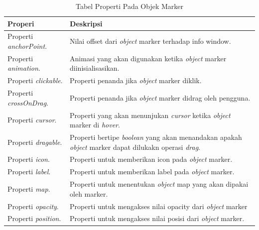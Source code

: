 \begin{table}[H] 
	\centering 
	\caption{Tabel Properti Pada Objek Marker}
	\label{tab:radioPackages}
	\begin{tabular}{|p{8cm}|p{8cm}|}
	\hline
		Properi & Deskripsi \\
    \hline
    	Properti \textit{anchorPoint}.& Nilai offset dari \textit{object} marker terhadap info window. \\
    	Properti \textit{animation}.  & Animasi yang akan digunakan ketika \textit{object} marker diinisialisasikan.  \\
    	Properti \textit{clickable}.  & Properti penanda jika \textit{object} marker diklik.  \\
    	Properti \textit{crossOnDrag}.  & Properti penanda jika \textit{object} marker didrag oleh pengguna. \\
    	Properti \textit{cursor}.  & Properti yang akan menunjukan \textit{cursor}  ketika \textit{object} marker di \textit{hover}. \\
    	Properti \textit{dragable}.  & Properti bertipe \textit{boolean} yang akan menandakan apakah \textit{object} marker dapat dilukakn operasi \textit{drag}. \\
    	Properti \textit{icon}.  & Properti untuk memberikan icon pada \textit{object} marker. \\
    	Properti \textit{label}.  & Properti untuk memberikan label pada \textit{object} marker. \\
    	Properti \textit{map}.  & Properti untuk menentukan \textit{object} map yang akan dipakai oleh marker. \\
    	Properti \textit{opacity}.  & Properti untuk mengakses nilai opacity dari \textit{object} marker \\
    	Properti \textit{position}.  & Properti untuk mengakses nilai posisi dari \textit{object} marker. \\
		\hline
	\end{tabular} 
\end{table}

